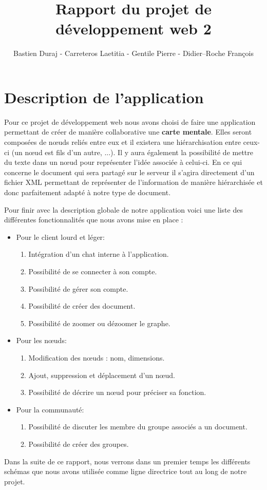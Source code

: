 \documentclass[11pt,a4paper]{article}
\author{Bastien Duraj - Carreteros Laetitia - Gentile Pierre - Didier--Roche François}
\title{Rapport du projet de développement web 2}
\begin{document}
\maketitle
\newpage

\tableofcontents
\newpage

\section{Description de l'application}
Pour ce projet de développement web nous avons choisi de faire une application permettant de créer de manière collaborative une \textbf{carte mentale}. Elles seront composées de nœuds reliés entre eux et il existera une hiérarchisation entre ceux-ci (un nœud est fils d'un autre, ...). Il y aura également la possibilité de mettre du texte dans un nœud pour représenter l'idée associée à celui-ci. 
En ce qui concerne le document qui sera partagé sur le serveur il s'agira directement d'un fichier XML permettant de représenter de l'information de manière hiérarchisée et donc parfaitement adapté à notre type de document. 

Pour finir avec la description globale de notre application voici une
liste des différentes fonctionnalités que nous avons mise en place :
\begin{itemize}
\item Pour le client lourd et léger:
	\begin{enumerate}
     	\item Intégration d'un chat interne à l'application.
     	\item Possibilité de se connecter à son compte.
     	\item Possibilité de gérer son compte.
     	\item Possibilité de créer des document.
     	\item Possibilité de zoomer ou dézoomer le graphe.
	\end{enumerate}
\item Pour les nœuds:
	\begin{enumerate}
     	\item Modification des nœuds : nom, dimensions.
     	\item Ajout, suppression et déplacement d'un nœud.
     	\item Possibilité de décrire un nœud pour préciser sa fonction.
	\end{enumerate}
\item Pour la communauté:
	\begin{enumerate}
     	\item Possibilité de discuter les membre du groupe associés a
          un document.
     	\item Possibilité de créer des groupes.
	\end{enumerate}
\end{itemize}
Dans la suite de ce rapport, nous verrons dans un premier temps les
différents schémas que nous avons utilisée comme ligne directrice tout
au long de notre projet.
\end{document}
